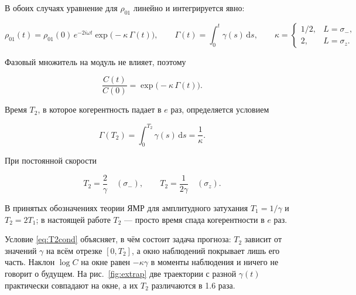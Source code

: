 \documentclass[12pt,a4paper]{report}
\numberwithin{equation}{chapter}
\newcommand{\dd}{\,\mathrm{d}}
\begin{document}
В обоих случаях уравнение для $\rho_{01}$ линейно и интегрируется явно:
\begin{keybox}
\begin{equation}
\rho_{01}(t)=\rho_{01}(0)\,e^{-2i\omega t}\exp\bigl(-\kappa\,\Gamma(t)\bigr),
\qquad \Gamma(t)=\int_0^t\gamma(s)\dd s,
\qquad\kappa=\begin{cases}1/2,&L=\sigma_-,\\ 2,&L=\sigma_z.\end{cases}
\end{equation}
\end{keybox}
Фазовый множитель на модуль не влияет, поэтому
\begin{keybox}
\begin{equation}
\frac{C(t)}{C(0)}=\exp\bigl(-\kappa\,\Gamma(t)\bigr).
\label{eq:C1q}
\end{equation}
\end{keybox}
Время $T_2$, в которое когерентность падает в $e$ раз, определяется условием
\begin{keybox}
\begin{equation}
\Gamma(T_2)=\int_0^{T_2}\gamma(s)\dd s=\frac1\kappa .
\label{eq:T2cond}
\end{equation}
\end{keybox}
При постоянной скорости
\begin{keybox}
\begin{equation}
T_2=\frac2\gamma\quad(\sigma_-),\qquad T_2=\frac1{2\gamma}\quad(\sigma_z).
\label{eq:T2const}
\end{equation}
\end{keybox}
В принятых обозначениях теории ЯМР для амплитудного затухания $T_1=1/\gamma$ и
$T_2=2T_1$; в настоящей работе $T_2$ --- просто время спада когерентности в $e$
раз.

Условие \eqref{eq:T2cond} объясняет, в чём состоит задача прогноза: $T_2$
зависит от значений $\gamma$ на всём отрезке $[0,T_2]$, а окно наблюдений
покрывает лишь его часть. Наклон $\log C$ на окне равен $-\kappa\gamma$ в
моменты наблюдения и ничего не говорит о будущем. На рис.~\ref{fig:extrap}
две траектории с разной $\gamma(t)$ практически совпадают на окне, а их $T_2$
различаются в 1.6 раза.
\end{document}
